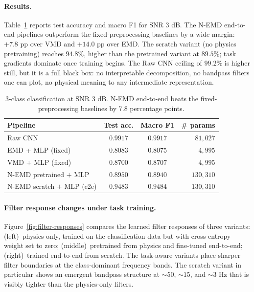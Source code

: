 \documentclass[journal]{IEEEtran}
\begin{document}
\paragraph{Results.} Table~\ref{tab:task-aware-3db} reports test accuracy and macro F1 for SNR $3$ dB. The N-EMD end-to-end pipelines outperform the fixed-preprocessing baselines by a wide margin: $+7.8$ pp over VMD and $+14.0$ pp over EMD. The scratch variant (no physics pretraining) reaches $94.8\%$, higher than the pretrained variant at $89.5\%$; task gradients dominate once training begins. The Raw CNN ceiling of $99.2\%$ is higher still, but it is a full black box: no interpretable decomposition, no bandpass filters one can plot, no physical meaning to any intermediate representation.

\begin{table}[t]
\centering
\caption{3-class classification at SNR $3$ dB. N-EMD end-to-end beats the fixed-preprocessing baselines by $7.8$ percentage points.}
\label{tab:task-aware-3db}
\begin{tabular}{lccr}
\toprule
Pipeline & Test acc. & Macro F1 & \# params \\
\midrule
Raw CNN                         & $0.9917$ & $0.9917$ & $81{,}027$ \\
EMD + MLP (fixed)               & $0.8083$ & $0.8075$ & $4{,}995$ \\
VMD + MLP (fixed)               & $0.8700$ & $0.8707$ & $4{,}995$ \\
N-EMD pretrained $+$ MLP        & $0.8950$ & $0.8940$ & $130{,}310$ \\
N-EMD scratch $+$ MLP (e2e)     & $\mathbf{0.9483}$ & $\mathbf{0.9484}$ & $130{,}310$ \\
\bottomrule
\end{tabular}
\end{table}

\paragraph{Filter response changes under task training.} Figure~\ref{fig:filter-responses} compares the learned filter responses of three variants: (left)~physics-only, trained on the classification data but with cross-entropy weight set to zero; (middle)~pretrained from physics and fine-tuned end-to-end; (right)~trained end-to-end from scratch. The task-aware variants place sharper filter boundaries at the class-dominant frequency bands. The scratch variant in particular shows an emergent bandpass structure at $\sim 50$, $\sim 15$, and $\sim 3$ Hz that is visibly tighter than the physics-only filters.
\end{document}

